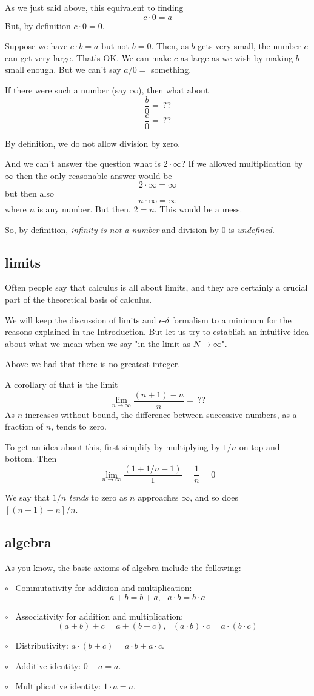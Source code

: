 \documentclass[11pt, oneside]{article}
\begin{document}
As we just said above, this equivalent to finding
\[ c \cdot 0 = a \]
But, by definition $c \cdot 0 = 0$.

Suppose we have $c \cdot b = a$ but not $b = 0$.  Then, as $b$ gets very small, the number $c$ can get very large.  That's OK.  We can make $c$ as large as we wish by making $b$ small enough.  But we can't say $a/0 = $ something.

If there were such a number (say $\infty$), then what about 
\[ \frac{b}{0} = \ ??  \]
\[ \frac{c}{0} = \ ??  \]

By definition, we do not allow division by zero.

And we can't answer the question what is $2 \cdot \infty$?  If we allowed multiplication by $\infty$ then the only reasonable answer would be
\[ 2 \cdot \infty = \infty \]
but then also
\[ n \cdot \infty = \infty \]
where $n$ is any number.  But then, $2 = n$.  This would be a mess.

So, by definition, \emph{infinity is not a number} and division by $0$ is \emph{undefined}.

\subsection*{limits}
Often people say that calculus is all about limits, and they are certainly a crucial part of the theoretical basis of calculus.  

We will keep the discussion of limits and $\epsilon$-$\delta$ formalism to a minimum for the reasons explained in the Introduction.  But let us try to establish an intuitive idea about what we mean when we say "in the limit as $N \rightarrow \infty$".

Above we had that there is no greatest integer.

A corollary of that is the limit
\[ \lim_{n \rightarrow \infty} \frac{(n + 1) - n}{n} = \ ?? \]
As $n$ increases without bound, the difference between successive numbers, as a fraction of $n$, tends to zero.

To get an idea about this, first simplify by multiplying by $1/n$ on top and bottom.  Then
\[ \lim_{n \rightarrow \infty} \frac{(1 + 1/n - 1)}{1} = \frac{1}{n} = 0 \]

We say that $1/n$ \emph{tends} to zero as $n$ approaches $\infty$, and so does $[(n+1)-n]/n$.

\subsection*{algebra}
As you know, the basic axioms of algebra include the following:

$\circ$ \ Commutativity for addition and multiplication: 
\[ a + b = b + a, \ \ \ a \cdot b = b \cdot a \]

$\circ$ \  Associativity for addition and multiplication:
\[ (a + b) + c = a + (b + c), \ \ \ (a \cdot b) \cdot c = a \cdot (b \cdot c) \]

$\circ$ \ Distributivity:  $a \cdot (b + c) = a \cdot b + a \cdot c$.

$\circ$ \ Additive identity:  $0 + a = a$.

$\circ$ \ Multiplicative identity:  $1 \cdot a = a$.
\end{document}
